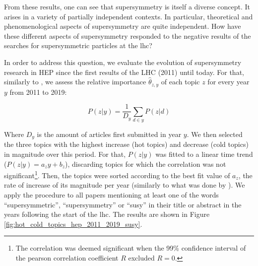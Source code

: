\documentclass[smallextended]{svjour3}
\begin{document}
From these results, one can see that supersymmetry is itself a diverse concept. It arises in a variety of partially independent contexts. In particular, theoretical and phenomenological aspects of supersymmetry are quite independent. How have these different aspects of supersymmetry responded to the negative results of the searches for supersymmetric particles at the \gls{lhc}?

In order to address this question, we evaluate the evolution of supersymmetry research in HEP since the first results of the LHC (2011) until today. For that, similarly to \citet{Hall2008}, we assess the relative importance $\hat{\theta}_{z,y}$ of each topic $z$ for every year $y$ from 2011 to 2019:

\begin{equation}
P(z|y) = \dfrac{1}{D_y}\sum_{d\in y} P(z|d)   
\end{equation}

Where $D_y$ is the amount of articles first submitted in year $y$. We then selected the three topics with the highest increase (hot topics) and decrease (cold topics) in magnitude over this period. For that, $P(z|y)$ was fitted to a linear time trend ($P(z|y) = a_zy+b_z$), discarding topics for which the correlation was not significant\footnote{The correlation was deemed significant when the 99\% confidence interval of the pearson correlation coefficient $R$ excluded $R=0$. }. Then, the topics were sorted according to the best fit value of $a_z$, the rate of increase of its magnitude per year (similarly to what was done by \citealt{Griffiths2004}). We apply the procedure to  all papers mentioning at least one of the words ``supersymmetric'', ``supersymmetry'' or ``susy'' in their title or abstract in the years following the start of the \gls{lhc}. The results are shown in Figure  \ref{fig:hot_cold_topics_hep_2011_2019_susy}. 


\begin{figure*}
    \centering
    
    \caption{\textbf{Cold and hot topics among those that mention supersymmetry since the first results of the LHC (2011-2019).} On the left, the three coldest topics are ``Susy phenomenology and superpartners'', ``Higgs beyond the SM'' and ``Higgs boson''. On the right, the three hottest topics are ``Supergravity'', ``Amplitudes and Feynman Diagrams'', ``Conformal Field Theory''.}
    \label{fig:hot_cold_topics_hep_2011_2019_susy}
\end{figure*}
\end{document}
